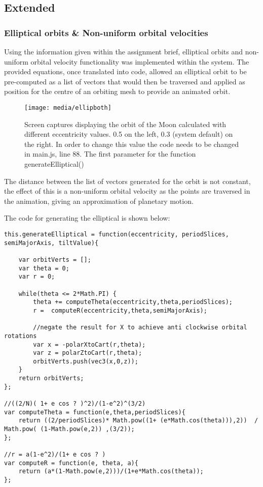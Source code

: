 \documentclass[titlepage]{article}
\begin{document}
\subsection{Extended}
\subsubsection{Elliptical orbits \& Non-uniform orbital velocities}
Using the information given within the assignment brief, elliptical orbits and non-uniform orbital velocity functionality was implemented within the system. The provided equations, once translated into code, allowed an elliptical orbit to be pre-computed as a list of vectors that would then be traversed and applied as position for the centre of an orbiting mesh to provide an animated orbit.


\begin{figure}[h!]
                \centering
                \texttt{[image: media/ellipboth]}
                \caption{Screen captures displaying the orbit of the Moon calculated with different eccentricity values. 0.5 on the left, 0.3 (system default) on the right. In order to change this value the code needs to be changed in main.js, line 88. The first parameter for the function generateElliptical()}
                \label{fig:basic_model}
            \end{figure}
\FloatBarrier
The distance between the list of vectors generated for the orbit is not constant, the effect of this is a non-uniform orbital velocity as the points are traversed in the animation, giving an approximation of planetary motion.

The code for generating the elliptical is shown below:

\begin{lstlisting}[caption=Above code can be found in OrbitUtils.js]
this.generateElliptical = function(eccentricity, periodSlices, semiMajorAxis, tiltValue){

    var orbitVerts = [];
    var theta = 0;
    var r = 0;

    while(theta <= 2*Math.PI) {
        theta += computeTheta(eccentricity,theta,periodSlices);
        r =  computeR(eccentricity,theta,semiMajorAxis);

        //negate the result for X to achieve anti clockwise orbital rotations
        var x = -polarXtoCart(r,theta);
        var z = polarZtoCart(r,theta);
        orbitVerts.push(vec3(x,0,z));
    }
    return orbitVerts;
};

//((2/N)( 1+ e cos ? )^2)/(1-e^2)^(3/2)
var computeTheta = function(e,theta,periodSlices){
    return ((2/periodSlices)* Math.pow((1+ (e*Math.cos(theta))),2))  / Math.pow( (1-Math.pow(e,2)) ,(3/2));
};

//r = a(1-e^2)/(1+ e cos ? )
var computeR = function(e, theta, a){
    return (a*(1-Math.pow(e,2)))/(1+e*Math.cos(theta));
};

\end{lstlisting}
\end{document}
